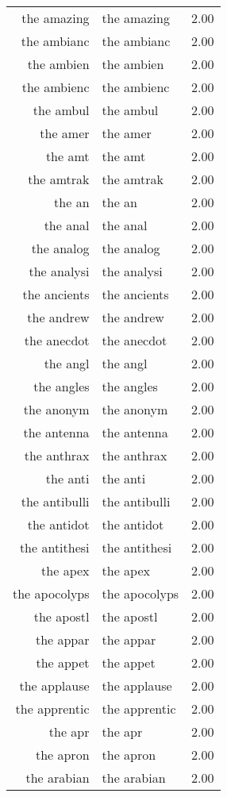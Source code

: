 \begin{table}[ht]
\begin{tabular}{rlr}
  the amazing & the amazing & 2.00 \\ 
  the ambianc & the ambianc & 2.00 \\ 
  the ambien & the ambien & 2.00 \\ 
  the ambienc & the ambienc & 2.00 \\ 
  the ambul & the ambul & 2.00 \\ 
  the amer & the amer & 2.00 \\ 
  the amt & the amt & 2.00 \\ 
  the amtrak & the amtrak & 2.00 \\ 
  the an & the an & 2.00 \\ 
  the anal & the anal & 2.00 \\ 
  the analog & the analog & 2.00 \\ 
  the analysi & the analysi & 2.00 \\ 
  the ancients & the ancients & 2.00 \\ 
  the andrew & the andrew & 2.00 \\ 
  the anecdot & the anecdot & 2.00 \\ 
  the angl & the angl & 2.00 \\ 
  the angles & the angles & 2.00 \\ 
  the anonym & the anonym & 2.00 \\ 
  the antenna & the antenna & 2.00 \\ 
  the anthrax & the anthrax & 2.00 \\ 
  the anti & the anti & 2.00 \\ 
  the antibulli & the antibulli & 2.00 \\ 
  the antidot & the antidot & 2.00 \\ 
  the antithesi & the antithesi & 2.00 \\ 
  the apex & the apex & 2.00 \\ 
  the apocolyps & the apocolyps & 2.00 \\ 
  the apostl & the apostl & 2.00 \\ 
  the appar & the appar & 2.00 \\ 
  the appet & the appet & 2.00 \\ 
  the applause & the applause & 2.00 \\ 
  the apprentic & the apprentic & 2.00 \\ 
  the apr & the apr & 2.00 \\ 
  the apron & the apron & 2.00 \\ 
  the arabian & the arabian & 2.00 \\ 

\end{tabular}
\end{table}
